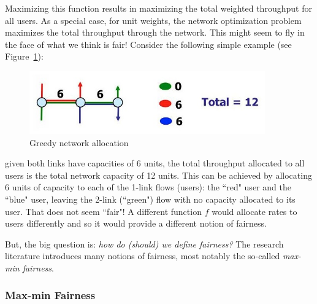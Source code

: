 \documentclass{article}
\begin{document}
Maximizing this function results in maximizing the total weighted throughput for all users. As a special case, for unit weights, the network optimization problem maximizes the total throughput through the network. This might seem to fly in the face of what we think is fair! Consider the following simple example (see Figure~\ref{fig:greedy-alloc}):
\begin{figure}[htbp] %
   \centering
   \includegraphics[width=4in]{figures/greedy-alloc.jpg} 
   \caption{Greedy network allocation}
   \label{fig:greedy-alloc}
\end{figure}
given both links have capacities of 6 units, the total throughput allocated to all users is the total network capacity of 12 units. This can be achieved by allocating 6 units of capacity to each of the 1-link flows (users): the ``red" user and the ``blue" user, leaving the 2-link (``green") flow with no capacity allocated to its user. That does not seem ``fair"! A different function $f$ would allocate rates to users differently and so it would provide a different notion of fairness.

But, the big question is: {\em how do (should) we define fairness?} The research literature introduces many notions of fairness, most notably the so-called {\em max-min fairness}.

\subsubsection{Max-min Fairness}
\end{document}
